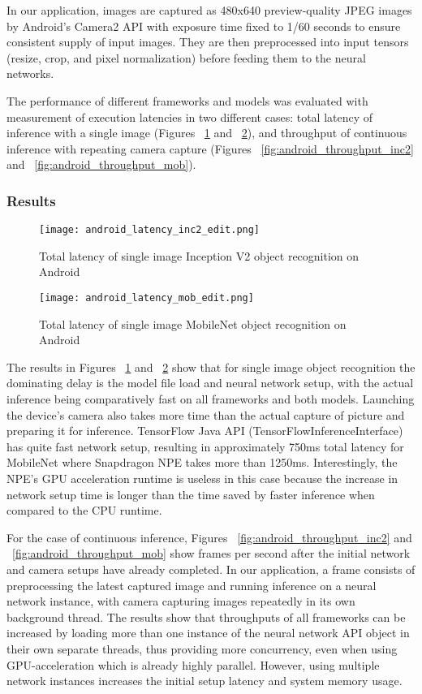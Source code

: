 \documentclass[sigconf]{acmart}
\begin{document}
In our application, images are captured as 480x640 preview-quality JPEG images by Android's Camera2 API with exposure time fixed to 1/60 seconds to ensure consistent supply of input images. They are then preprocessed into input tensors (resize, crop, and pixel normalization) before feeding them to the neural networks.

The performance of different frameworks and models was evaluated with measurement of execution latencies in two different cases: total latency of inference with a single image (Figures ~\ref{fig:android_latency_inc2} and ~\ref{fig:android_latency_mob}), and throughput of continuous inference with repeating camera capture (Figures ~\ref{fig:android_throughput_inc2} and ~\ref{fig:android_throughput_mob}).

\subsubsection{Results}\begin{figure}[t]
\centering
\texttt{[image: android\_latency\_inc2\_edit.png]}
\caption{Total latency of single image Inception V2 object recognition on Android}
\label{fig:android_latency_inc2}
\end{figure}\begin{figure}[t]
\centering
\texttt{[image: android\_latency\_mob\_edit.png]}
\caption{Total latency of single image MobileNet object recognition on Android}
\label{fig:android_latency_mob}
\end{figure}

The results in Figures ~\ref{fig:android_latency_inc2} and ~\ref{fig:android_latency_mob} show that for single image object recognition the dominating delay is the model file load and neural network setup, with the actual inference being comparatively fast on all frameworks and both models. Launching the device's camera also takes more time than the actual capture of picture and preparing it for inference. TensorFlow Java API (TensorFlowInferenceInterface) has quite fast network setup, resulting in approximately 750ms total latency for MobileNet where Snapdragon NPE takes more than 1250ms. Interestingly, the NPE's GPU acceleration runtime is useless in this case because the increase in network setup time is longer than the time saved by faster inference when compared to the CPU runtime.

For the case of continuous inference, Figures ~\ref{fig:android_throughput_inc2} and ~\ref{fig:android_throughput_mob} show frames per second after the initial network and camera setups have already completed. In our application, a frame consists of preprocessing the latest captured image and running inference on a neural network instance, with camera capturing images repeatedly in its own background thread. The results show that throughputs of all frameworks can be increased by loading more than one instance of the neural network API object in their own separate threads, thus providing more concurrency, even when using GPU-acceleration which is already highly parallel. However, using multiple network instances increases the initial setup latency and system memory usage.
\end{document}
